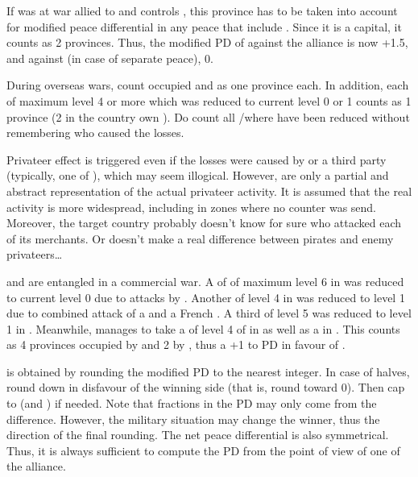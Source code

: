 \begin{exemple}
  If \paysCrimee was at war allied to \TUR and \RUS controls \provinceCrimee,
  this province has to be taken into account for modified peace differential
  in any peace that include \TUR. Since it is a capital, it counts as 2
  provinces. Thus, the modified PD of \RUS against the alliance is now +1.5,
  and against \TUR (in case of separate peace), 0.
\end{exemple}

\label{chPeace:Privateer Effect}
\bparag During overseas wars, count occupied \COL and \TP as one province
each.
 In addition, each \TradeFLEET of maximum level 4 or
more which was reduced to current level 0 or 1 counts as 1 province (2 in the
country own \CTZ).
\bparag Do count all \CTZ/\STZ where \TradeFLEET have been reduced without
remembering who caused the losses.

\begin{designnote}
  Privateer effect is triggered even if the losses were caused by
   or a third party \corsaire (typically, one of
  \Barbaresques), which may seem illogical. However, \corsaire are only a
  partial and abstract representation of the actual privateer activity. It is
  assumed that the real activity is more widespread, including in zones where
  no counter was send. Moreover, the target country probably doesn't know for
  sure who attacked each of its merchants. Or doesn't make a real difference
  between pirates and enemy privateers\ldots
\end{designnote}

\begin{exemple}
  \FRA and \ANG are entangled in a commercial war. A \TradeFLEET of \ANG of
  maximum level 6 in  was reduced to current level 0 due to
  attacks by \leaderBart. Another \TradeFLEET of level 4 in 
  was reduced to level 1 due to combined attack of a  \corsaire
  and a French \corsaire. A third \TradeFLEET of level 5 was reduced to level
  1 in . Meanwhile, \ANG manages to take a \COL of level 4 of \FRA
  in \granderegionQuebec as well as a \TP in \continentIndia. This counts as 4
  provinces occupied by \FRA and 2 by \ANG, thus a +1 to PD in favour of \FRA.
\end{exemple}

 is obtained by rounding the modified PD to
the nearest integer. In case of halves, round down in disfavour of the winning
side (that is, round toward 0). Then cap to  (and ) if
needed.
\bparag Note that fractions in the PD may only come from the \STAB
difference. However, the military situation may change the winner, thus the
direction of the final rounding.
\bparag The net peace differential is also symmetrical. Thus, it is always
sufficient to compute the PD from the point of view of one of the alliance.

